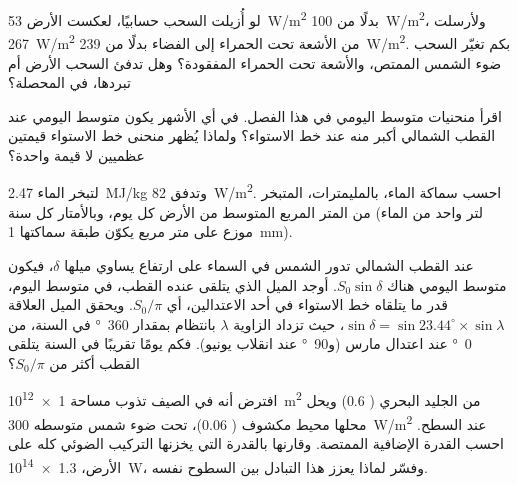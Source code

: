 \begin{exercise}[$\star\star$]\label{exo:g10:earth-energy-budget:10}
لو أُزيلت السحب حسابيًا، لعكست الأرض
\qty{53}{W/m^2} بدلًا من \qty{100}{W/m^2}، ولأرسلت \qty{267}{W/m^2} من الأشعة
تحت الحمراء إلى الفضاء بدلًا من \qty{239}{W/m^2}. بكم تغيّر السحب ضوء الشمس
الممتص، والأشعة تحت الحمراء المفقودة؟ وهل تدفئ السحب الأرض أم تبردها، في
المحصلة؟
\end{exercise}

\begin{exercise}[$\star\star$]\label{exo:g10:earth-energy-budget:11}
اقرأ منحنيات متوسط  اليومي في هذا الفصل. في أي الأشهر يكون متوسط 
اليومي عند القطب الشمالي أكبر منه عند خط الاستواء؟ ولماذا يُظهر منحنى خط
الاستواء قيمتين عظميين لا قيمة واحدة؟
\end{exercise}

\begin{exercise}[$\star\star\star$]\label{exo:g10:earth-energy-budget:12}
 لتبخر الماء \qty{2.47}{MJ/kg} وتدفق 
\qty{82}{W/m^2}. احسب سماكة الماء، بالمليمترات، المتبخر من المتر المربع المتوسط
من الأرض كل يوم، وبالأمتار كل سنة (لتر واحد من الماء موزع على متر مربع يكوّن
طبقة سماكتها
\qty{1}{mm}).
\end{exercise}

\begin{exercise}[$\star\star\star$]\label{exo:g10:earth-energy-budget:13}
عند القطب الشمالي تدور الشمس في السماء على ارتفاع يساوي ميلها $\delta$، فيكون
متوسط  اليومي هناك $S_0 \sin
\delta$. أوجد الميل الذي يتلقى عنده القطب، في متوسط اليوم، قدر ما يتلقاه خط
الاستواء في أحد الاعتدالين، أي $S_0/\pi$. ويحقق الميل العلاقة
$\sin\delta = \sin 23.44^\circ \times \sin\lambda$، حيث
تزداد الزاوية $\lambda$ بانتظام بمقدار \qty{360}{\degree} في السنة، من
\qty{0}{\degree} عند اعتدال مارس (و\qty{90}{\degree} عند انقلاب
يونيو). فكم يومًا تقريبًا في السنة يتلقى القطب أكثر من
$S_0/\pi$؟
\end{exercise}

\begin{exercise}[$\star\star\star$]\label{exo:g10:earth-energy-budget:14}
افترض أنه في الصيف تذوب مساحة \qty{1e12}{m^2} من الجليد البحري ( 0.6)
ويحل محلها محيط مكشوف ( 0.06)، تحت ضوء شمس متوسطه
\qty{300}{W/m^2} عند السطح. احسب القدرة الإضافية
الممتصة. وقارنها بالقدرة التي يخزنها التركيب الضوئي كله على
الأرض، \qty{1.3e14}{W}، وفسّر لماذا يعزز هذا التبادل بين السطوح
نفسه.
\end{exercise}

